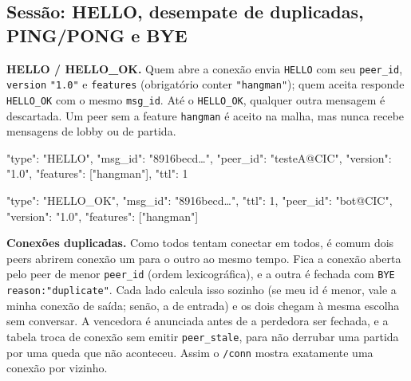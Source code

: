 \documentclass[11pt,a4paper]{article}
\begin{document}
\subsection{Sessão: HELLO, desempate de duplicadas, PING/PONG e BYE}
\textbf{HELLO / HELLO\_OK.} Quem abre a conexão envia \texttt{HELLO} com seu \texttt{peer\_id}, \texttt{version} \texttt{"1.0"} e \texttt{features} (obrigatório conter \texttt{"hangman"}); quem aceita responde \texttt{HELLO\_OK} com o mesmo \texttt{msg\_id}. Até o \texttt{HELLO\_OK}, qualquer outra mensagem é descartada. Um peer sem a feature \texttt{hangman} é aceito na malha, mas nunca recebe mensagens de lobby ou de partida.
\begin{codigo}
{
  "type": "HELLO",
  "msg_id": "8916becd…",
  "peer_id": "testeA@CIC",
  "version": "1.0",
  "features": ["hangman"],
  "ttl": 1
}
\end{codigo}
\begin{codigo}
{
  "type": "HELLO_OK",
  "msg_id": "8916becd…",
  "ttl": 1,
  "peer_id": "bot@CIC",
  "version": "1.0",
  "features": ["hangman"]
}
\end{codigo}
\textbf{Conexões duplicadas.} Como todos tentam conectar em todos, é comum dois peers abrirem conexão um para o outro ao mesmo tempo. Fica a conexão aberta pelo peer de menor \texttt{peer\_id} (ordem lexicográfica), e a outra é fechada com \texttt{BYE} \texttt{reason:"duplicate"}. Cada lado calcula isso sozinho (se meu id é menor, vale a minha conexão de saída; senão, a de entrada) e os dois chegam à mesma escolha sem conversar. A vencedora é anunciada antes de a perdedora ser fechada, e a tabela troca de conexão sem emitir \texttt{peer\_stale}, para não derrubar uma partida por uma queda que não aconteceu. Assim o \texttt{/conn} mostra exatamente uma conexão por vizinho.
\end{document}
